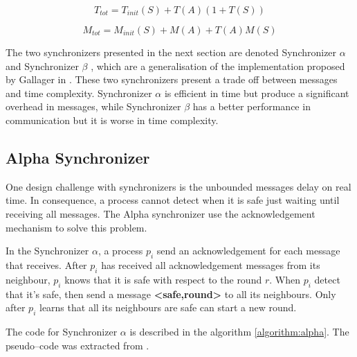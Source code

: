 \begin{equation}
\label{ec:mess}
 T_{tot} = T_{init}(S) + T(A)(1+T(S)) 
\end{equation}

\begin{equation}
\label{ec:time}
M_{tot} = M_{init}(S) + M(A) + T(A)M(S) 
\end{equation}


The two synchronizers presented in the next section are denoted Synchronizer $\alpha$ and Synchronizer $\beta$ \cite{awerbuch1985complexity}, which are a generalisation of the implementation proposed by Gallager in \cite{gallager1982distributed}. These two synchronizers present a trade off between messages and time complexity. Synchronizer $\alpha$ is efficient in time but produce a significant overhead in messages, while Synchronizer $\beta$ has a better performance in communication but it is worse in time complexity.



\subsection{Alpha Synchronizer}

One design challenge with synchronizers is the unbounded messages delay on real time. In consequence, a process cannot detect when it is safe just waiting until receiving all messages. The Alpha synchronizer use the acknowledgement mechanism to solve this problem. 

In the Synchronizer $\alpha$, a process $p_i$ send an acknowledgement for each message that receives. After $p_i$ has received all acknowledgement messages from its neighbour, $p_i$ knows that it is safe with respect to the round $r$. When $p_i$ detect that it's safe, then send a message \textbf{<safe,round>} to all its neighbours. Only after $p_i$ learns that all its neighbours are safe can start a new round.

The code for Synchronizer $\alpha$ is described in the algorithm \ref{algorithm:alpha}. The pseudo--code was extracted from \cite{attiya2004distributed}.  



